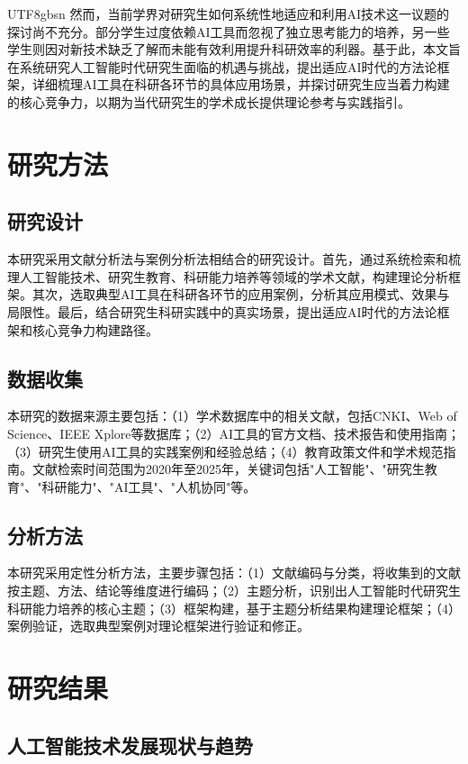\documentclass[12pt,a4paper]{article}
\begin{document}
\begin{CJK}{UTF8}{gbsn}
然而，当前学界对研究生如何系统性地适应和利用AI技术这一议题的探讨尚不充分。部分学生过度依赖AI工具而忽视了独立思考能力的培养，另一些学生则因对新技术缺乏了解而未能有效利用提升科研效率的利器。基于此，本文旨在系统研究人工智能时代研究生面临的机遇与挑战，提出适应AI时代的方法论框架，详细梳理AI工具在科研各环节的具体应用场景，并探讨研究生应当着力构建的核心竞争力，以期为当代研究生的学术成长提供理论参考与实践指引。

\section{研究方法}

\subsection{研究设计}

本研究采用文献分析法与案例分析法相结合的研究设计。首先，通过系统检索和梳理人工智能技术、研究生教育、科研能力培养等领域的学术文献，构建理论分析框架。其次，选取典型AI工具在科研各环节的应用案例，分析其应用模式、效果与局限性。最后，结合研究生科研实践中的真实场景，提出适应AI时代的方法论框架和核心竞争力构建路径。

\subsection{数据收集}

本研究的数据来源主要包括：（1）学术数据库中的相关文献，包括CNKI、Web of Science、IEEE Xplore等数据库；（2）AI工具的官方文档、技术报告和使用指南；（3）研究生使用AI工具的实践案例和经验总结；（4）教育政策文件和学术规范指南。文献检索时间范围为2020年至2025年，关键词包括"人工智能"、"研究生教育"、"科研能力"、"AI工具"、"人机协同"等。

\subsection{分析方法}

本研究采用定性分析方法，主要步骤包括：（1）文献编码与分类，将收集到的文献按主题、方法、结论等维度进行编码；（2）主题分析，识别出人工智能时代研究生科研能力培养的核心主题；（3）框架构建，基于主题分析结果构建理论框架；（4）案例验证，选取典型案例对理论框架进行验证和修正。

\section{研究结果}

\subsection{人工智能技术发展现状与趋势}


\end{CJK}
\end{document}
